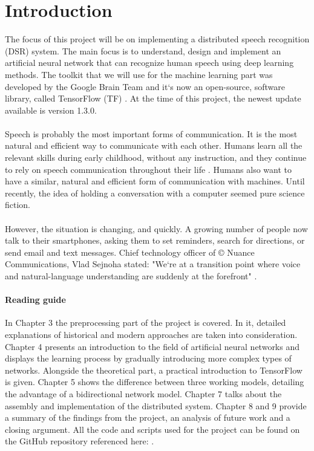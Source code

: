 \chapter{Introduction}\label{ch:introduction}
The focus of this project will be on implementing a distributed speech recognition (DSR) system.
The main focus is to understand, design and implement an artificial neural network that can recognize human speech using deep learning methods.
The toolkit that we will use for the machine learning part was developed by the Google Brain Team and it`s now an open-source, software library, called TensorFlow (TF) \cite{tensorflow2015-whitepaper}.
At the time of this project, the newest update available is version 1.3.0.\\\\
Speech is probably the most important forms of communication.
It is the most natural and efficient way to communicate with
each other. Humans learn all the relevant skills during early
childhood, without any instruction, and they continue to rely
on speech communication throughout their life \cite{kamblespeech}.
Humans also want to have a similar, natural and efficient form of communication with machines. 
Until recently, the idea of holding a conversation with a computer seemed pure science fiction.\\\\
However, the situation is changing, and quickly.
A growing number of people now talk to their smartphones, asking them to set reminders, search for directions, or send email and text messages.
Chief technology officer of \copyright{} Nuance Communications, Vlad Sejnoha stated: "We`re at a transition point where voice and natural-language understanding are suddenly at the forefront" \cite{kamblespeech}.\\

\subsubsection{Reading guide}
In Chapter 3 the preprocessing part of the project is covered. In it, detailed explanations of historical and modern approaches are taken into consideration. Chapter 4 presents an introduction to the field of artificial neural networks and displays the learning process by gradually introducing more complex types of networks. Alongside the theoretical part, a practical introduction to TensorFlow is given. Chapter 5 shows the difference between three working models, detailing the advantage of a bidirectional network model. Chapter 7 talks about the assembly and implementation of the distributed system. Chapter 8 and 9 provide a summary of the findings from the project, an analysis of future work and a closing argument. All the code and scripts used for the project can be found on the GitHub repository referenced here: \cite{mavericks2017}.
